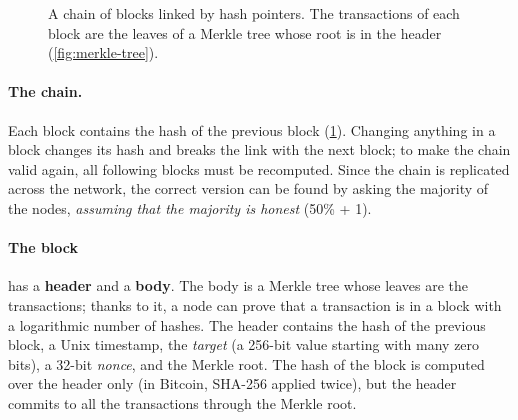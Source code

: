 \begin{figure}[H]
\centering
{}
\caption{A chain of blocks linked by hash pointers. The transactions of each block are the leaves of a Merkle tree whose root is in the header (\cref{fig:merkle-tree}).}
\label{fig:blockchain}
\end{figure}

\paragraph{The chain.} Each block contains the hash of the previous block (\cref{fig:blockchain}). Changing anything in a block changes its hash and breaks the link with the next block; to make the chain valid again, all following blocks must be recomputed. Since the chain is replicated across the network, the correct version can be found by asking the majority of the nodes, \emph{assuming that the majority is honest} (50\% + 1).

\paragraph{The block} has a \textbf{header} and a \textbf{body}. The body is a Merkle tree whose leaves are the transactions; thanks to it, a node can prove that a transaction is in a block with a logarithmic number of hashes. The header contains the hash of the previous block, a Unix timestamp, the \emph{target} (a 256-bit value starting with many zero bits), a 32-bit \emph{nonce}, and the Merkle root. The hash of the block is computed over the header only (in Bitcoin, SHA-256 applied twice), but the header commits to all the transactions through the Merkle root.

